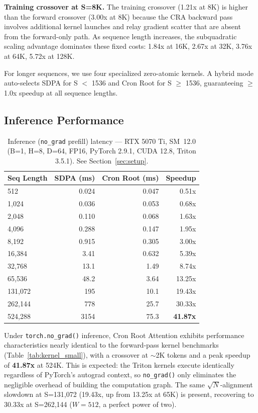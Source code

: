 \documentclass{article}
\begin{document}
    \textbf{Training crossover at S=8K.} The training crossover (1.21x at 8K) is higher than the forward crossover (3.00x at 8K) because the CRA backward pass involves additional kernel launches and relay gradient scatter that are absent from the forward-only path. As sequence length increases, the subquadratic scaling advantage dominates these fixed costs: 1.84x at 16K, 2.67x at 32K, 3.76x at 64K, 5.72x at 128K.

    For longer sequences, we use four specialized zero-atomic kernels. A hybrid mode auto-selects SDPA for S $<$ 1536 and Cron Root for S $\geq$ 1536, guaranteeing $\geq$1.0x speedup at all sequence lengths.

    \subsection{Inference Performance}

    \begin{table}[h]
    \centering
    \caption{Inference (\texttt{no\_grad} prefill) latency — RTX 5070 Ti, SM~12.0 (B=1, H=8, D=64, FP16, PyTorch 2.9.1, CUDA 12.8, Triton 3.5.1). See Section~\ref{sec:setup}.}
    \begin{tabular}{lrrr}
    \toprule
    Seq Length & SDPA (ms) & Cron Root (ms) & Speedup \\
    \midrule
    512 & 0.024 & 0.047 & 0.51x \\
    1,024 & 0.036 & 0.053 & 0.68x \\
    2,048 & 0.110 & 0.068 & 1.63x \\
    4,096 & 0.288 & 0.147 & 1.95x \\
    8,192 & 0.915 & 0.305 & 3.00x \\
    16,384 & 3.41 & 0.632 & 5.39x \\
    32,768 & 13.1 & 1.49 & 8.74x \\
    65,536 & 48.2 & 3.64 & 13.25x \\
    131,072 & 195 & 10.1 & 19.43x \\
    262,144 & 778 & 25.7 & 30.33x \\
    524,288 & 3154 & 75.3 & \textbf{41.87x} \\
    \bottomrule
    \end{tabular}
    \label{tab:inference}
    \end{table}

    Under \texttt{torch.no\_grad()} inference, Cron Root Attention exhibits performance characteristics nearly identical to the forward-pass kernel benchmarks (Table~\ref{tab:kernel_small}), with a crossover at $\sim$2K tokens and a peak speedup of \textbf{41.87x} at 524K. This is expected: the Triton kernels execute identically regardless of PyTorch's autograd context, so \texttt{no\_grad()} only eliminates the negligible overhead of building the computation graph. The same $\sqrt{N}$-alignment slowdown at S=131,072 (19.43x, up from 13.25x at 65K) is present, recovering to 30.33x at S=262,144 ($W=512$, a perfect power of two).
    \label{sec:inference}
\end{document}
